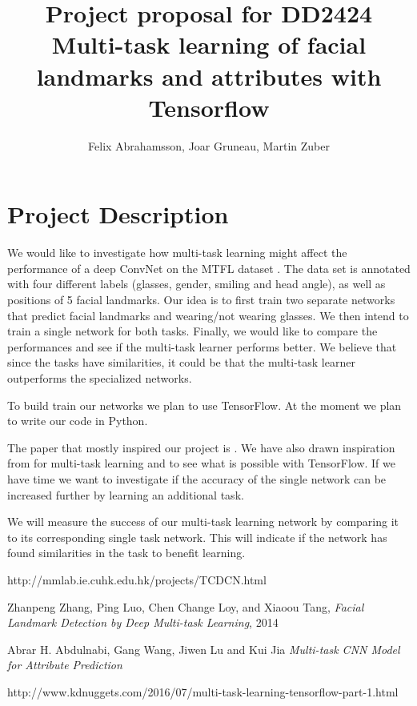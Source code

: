 \documentclass[a4paper,10pt]{extarticle}
\begin{document}
\title{Project proposal for DD2424\\ \vspace{2mm}
\textbf{Multi-task learning of facial landmarks and attributes with Tensorflow}
}
\author{Felix Abrahamsson, Joar Gruneau, Martin Zuber}
\maketitle

\section*{Project Description}
We would like to investigate how multi-task learning might affect the performance of a deep ConvNet on the MTFL dataset \cite{MTFL}. The data set is annotated with four different labels (glasses, gender, smiling and head angle), as well as positions of 5 facial landmarks. Our idea is to first train two separate networks that predict facial landmarks and wearing/not wearing glasses. We then intend to train a single network for both tasks. Finally, we would like to compare the performances and see if the multi-task learner performs better. We believe that since the tasks have similarities, it could be that the multi-task learner outperforms the specialized networks. 

To build train our networks we plan to use TensorFlow. At the moment we plan to write our code in Python.

The paper that mostly inspired our project is \cite{zhang}. We have also drawn inspiration from \cite{Multiple} for multi-task learning and \cite{tensor} to see what is possible with TensorFlow. If we have time we want to investigate if the accuracy of the single network can be increased further by learning an additional task.

We will measure the success of our multi-task learning network by comparing it to its corresponding single task network. This will indicate if the network has found similarities in the task to benefit learning.

\begin{thebibliography}{9}
http://mmlab.ie.cuhk.edu.hk/projects/TCDCN.html

Zhanpeng Zhang, Ping Luo, Chen Change Loy, and Xiaoou Tang, \textit{Facial Landmark Detection by Deep Multi-task Learning}, 2014

Abrar H. Abdulnabi, Gang Wang, Jiwen Lu and Kui Jia \textit{Multi-task CNN Model for Attribute Prediction}

http://www.kdnuggets.com/2016/07/multi-task-learning-tensorflow-part-1.html

\end{thebibliography}
\end{document}
